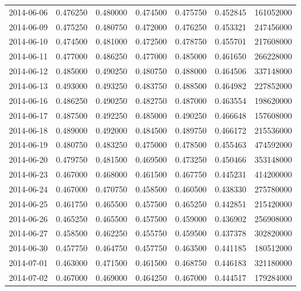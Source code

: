 \begin{tabular}{lrrrrrr}
2014-06-06 &    0.476250 &    0.480000 &    0.474500 &    0.475750 &    0.452845 &   161052000 \\
2014-06-09 &    0.475250 &    0.480750 &    0.472000 &    0.476250 &    0.453321 &   247456000 \\
2014-06-10 &    0.474500 &    0.481000 &    0.472500 &    0.478750 &    0.455701 &   217608000 \\
2014-06-11 &    0.477000 &    0.486250 &    0.477000 &    0.485000 &    0.461650 &   266228000 \\
2014-06-12 &    0.485000 &    0.490250 &    0.480750 &    0.488000 &    0.464506 &   337148000 \\
2014-06-13 &    0.493000 &    0.493250 &    0.483750 &    0.488500 &    0.464982 &   227852000 \\
2014-06-16 &    0.486250 &    0.490250 &    0.482750 &    0.487000 &    0.463554 &   198620000 \\
2014-06-17 &    0.487500 &    0.492250 &    0.485000 &    0.490250 &    0.466648 &   157608000 \\
2014-06-18 &    0.489000 &    0.492000 &    0.484500 &    0.489750 &    0.466172 &   215536000 \\
2014-06-19 &    0.480750 &    0.483250 &    0.475000 &    0.478500 &    0.455463 &   474592000 \\
2014-06-20 &    0.479750 &    0.481500 &    0.469500 &    0.473250 &    0.450466 &   353148000 \\
2014-06-23 &    0.467000 &    0.468000 &    0.461500 &    0.467750 &    0.445231 &   414200000 \\
2014-06-24 &    0.467000 &    0.470750 &    0.458500 &    0.460500 &    0.438330 &   275780000 \\
2014-06-25 &    0.461750 &    0.465500 &    0.457500 &    0.465250 &    0.442851 &   215420000 \\
2014-06-26 &    0.465250 &    0.465500 &    0.457500 &    0.459000 &    0.436902 &   256908000 \\
2014-06-27 &    0.458500 &    0.462250 &    0.455750 &    0.459500 &    0.437378 &   302820000 \\
2014-06-30 &    0.457750 &    0.464750 &    0.457750 &    0.463500 &    0.441185 &   180512000 \\
2014-07-01 &    0.463000 &    0.471500 &    0.461500 &    0.468750 &    0.446183 &   321180000 \\
2014-07-02 &    0.467000 &    0.469000 &    0.464250 &    0.467000 &    0.444517 &   179284000 \\

\end{tabular}
